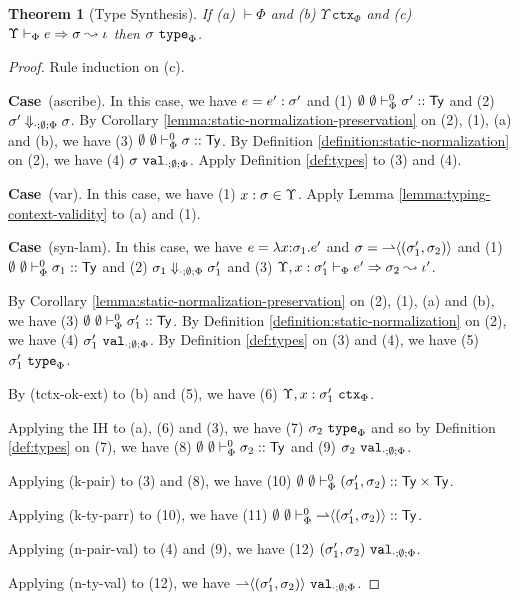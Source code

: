 \documentclass[12pt]{article}
\newtheorem{theorem}{Theorem}
\newcommand{\pfcase}[1]{\textbf{Case}~#1. }
\begin{document}
\begin{theorem}[Type Synthesis]
\label{lemma:type-synthesis}
If (a) $\vdash \Phi$ and (b) $\Upsilon~\mathtt{ctx}_{\Phi}$ and (c) $\esynX{e}{\st}{\iota}$ then $\istype{\st}{\Phi}$.
\end{theorem}
\begin{proof}Rule induction on (c).

\pfcase{(ascribe)} In this case, we have $e=e' : \st'$ and (1) $\sofkVXz{\st'}{\kty}$ and (2) $\st' \Downarrow_{\cdot;\emptyset;\Phi} \st$. By Corollary \ref{lemma:static-normalization-preservation} on (2), (1), (a) and (b), we have (3) $\sofkVXz{\st}{\kty}$. By Definition \ref{definition:static-normalization} on (2), we have (4) $\sval{\st}{\cdot;\emptyset;\Phi}$. Apply Definition \ref{def:types} to (3) and (4). 

\pfcase{(var)} In this case, we have (1) $x : \st \in \Upsilon$. Apply Lemma \ref{lemma:typing-context-validity} to (a) and (1).

\pfcase{(syn-lam)} In this case, we have $e=\elam{\st_1}{x}{e'}$ and $\st=\sty{\rightharpoonup}{(\st_1', \st_2)}$ and (1) $\sofkVXz{\st_1}{\kty}$ and (2) $\st_1 \Downarrow_{\cdot;\emptyset;\Phi} \st_1'$ and (3) $\esyn{\Upsilon, x : \st_1'}{\Phi}{e'}{\st_2}{\iota'}$. 

By Corollary \ref{lemma:static-normalization-preservation} on (2), (1), (a) and (b), we have (3) $\sofkVXz{\st_1'}{\kty}$. By Definition \ref{definition:static-normalization} on (2), we have (4) $\sval{\st_1'}{\cdot;\emptyset;\Phi}$. By Definition \ref{def:types} on (3) and (4), we have (5) $\istype{\st_1'}{\Phi}$.

By (tctx-ok-ext) to (b) and (5), we have (6) $\Upsilon, x : \st_1'~\mathtt{ctx}_\Phi$.

Applying the IH to (a), (6) and (3), we have (7) $\istype{\st_2}{\Phi}$ and so by Definition \ref{def:types} on (7), we have (8) $\sofkVXz{\st_2}{\kty}$ and (9) $\sval{\st_2}{\cdot;\emptyset;\Phi}$.

Applying (k-pair) to (3) and (8), we have (10) $\sofkVXz{(\st_1', \st_2)}{\kty\times\kty}$.

Applying (k-ty-parr) to (10), we have (11) $\sofkVXz{\sty{\rightharpoonup}{(\st_1', \st_2)}}{\kty}$.

Applying (n-pair-val) to (4) and (9), we have (12) $\sval{(\st_1', \st_2)}{\cdot;\emptyset;\Phi}$.

Applying (n-ty-val) to (12), we have $\sval{\sty{\rightharpoonup}{(\st_1', \st_2)}}{\cdot;\emptyset;\Phi}$.


\end{proof}
\end{document}
